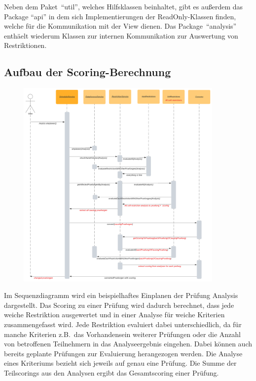 Neben dem Paket~\enquote{util}, welches Hilfsklassen beinhaltet, gibt es außerdem das Package \enquote{api}
in dem sich Implementierungen der ReadOnly-Klassen finden, welche für die Kommunikation mit der View dienen.
Das Package~\enquote{analysis} enthäelt wiederum Klassen zur internen Kommunikation zur Auswertung von Restriktionen.
\pagebreak

\subsection{Aufbau der Scoring-Berechnung}\label{subsec:aufbau-der-scoring-berechnung}
\begin{figure}[!h]
    \includegraphics[width=0.9\textwidth]{extra/Sequence_diagram}\label{fig:figure}
\end{figure}

Im Sequenzdiagramm wird ein beispielhaftes Einplanen der Prüfung Analysis dargestellt.
Das Scoring zu einer Prüfung wird dadurch berechnet, dass jede weiche Restriktion ausgewertet und in
einer Analyse für weiche Kriterien zusammengefasst wird.
Jede Restriktion evaluiert dabei unterschiedlich, da für manche Kriterien z.B.\ das Vorhandensein weiterer
Prüfungen oder die Anzahl von betroffenen Teilnehmern in das Analyseergebnis eingehen.
Dabei können auch bereits geplante Prüfungen zur Evaluierung herangezogen werden.
Die Analyse eines Kriteriums bezieht sich jeweils auf genau eine Prüfung.
Die Summe der Teilscorings aus den Analysen ergibt das Gesamtscoring einer Prüfung.
